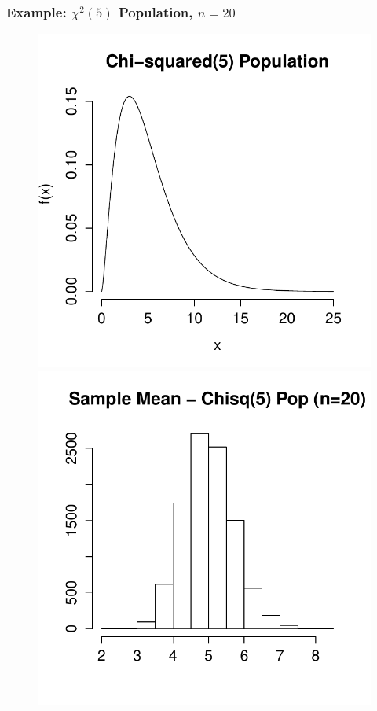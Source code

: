 \begin{frame}
\frametitle{Example: $\chi^2(5)$ Population, $n = 20$}
\begin{figure}
\centering
\includegraphics[scale = 0.4]{./images/chisq_pop}
\includegraphics[scale = 0.4]{./images/xbar_chisq}
\end{figure}
\end{frame}

